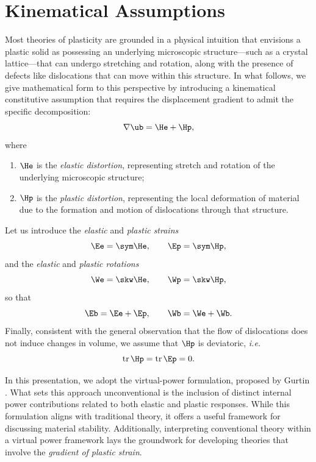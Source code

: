 \section{Kinematical Assumptions}
Most theories of plasticity are grounded in a physical intuition that envisions a plastic solid as possessing an underlying microscopic structure---such as a crystal lattice---that can undergo stretching and rotation, along with the presence of defects like dislocations that can move within this structure. In what follows, we give mathematical form to this perspective by introducing a kinematical constitutive assumption that requires the displacement gradient to admit the specific decomposition:
\begin{equation}
\nabla\ub=\He+\Hp,
\end{equation}
where
\begin{enumerate}
	\item $\He$ is the \textit{elastic distortion}, representing stretch and rotation of the underlying microscopic structure;
	\item $\Hp$ is the \textit{plastic distortion}, representing the local deformation of material due to 	the formation and motion of dislocations through that structure.
\end{enumerate}

Let us introduce the \textit{elastic} and \textit{plastic strains}
\begin{equation}
	\Ee=\sym\He, \qquad \Ep=\sym\Hp,
\end{equation}and the \textit{elastic} and \textit{plastic rotations}
\begin{equation}
	\We=\skw\He, \qquad \Wp=\skw\Hp,
\end{equation}
so that
\begin{equation}
\Eb=\Ee+\Ep, \qquad \Wb=\We+\Wb.
\end{equation}
Finally, consistent with the general observation that the flow of dislocations
does not induce changes in volume, we assume that $\Hp$ is deviatoric, \textit{i.e.}
\begin{equation}
\operatorname{tr} \Hp=\operatorname{tr}\Ep=0.
\end{equation}

In this presentation, we adopt the virtual-power formulation, proposed by Gurtin \cite{Gurtin_2003,Gurtin2}. 
What sets this approach unconventional is the inclusion of distinct internal power contributions related to both elastic and plastic responses. While this formulation aligns with traditional theory, it offers a useful framework for discussing material stability. Additionally, interpreting conventional theory within a virtual power framework lays the groundwork for developing theories that involve the \textit{gradient of plastic strain}.

